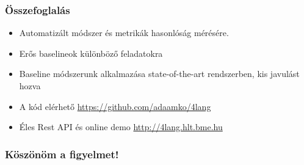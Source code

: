 \documentclass[bigger]{beamer}
\begin{document}
\begin{frame}
\frametitle{Összefoglalás}
	\begin{itemize}
	    \pause \item Automatizált módszer és metrikák hasonlóság mérésére.
	    \pause \item Erős baselineok különböző feladatokra
	    \pause \item Baseline módszerunk alkalmazása state-of-the-art rendszerben, kis javulást hozva
	    \pause \item A kód elérhető \url{https://github.com/adaamko/4lang}
	    \pause \item Éles Rest API és online demo \url{http://4lang.hlt.bme.hu}
	\end{itemize}

\end{frame}
\begin{frame}
    \frametitle{Köszönöm a figyelmet!}
    \AtNextBibliography{\tiny}
    \printbibliography
\end{frame}
\end{document}
